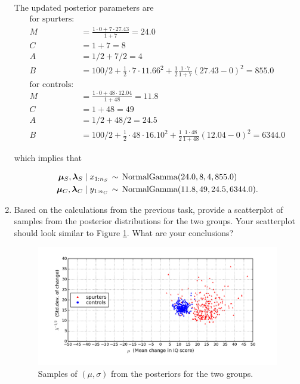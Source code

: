 \documentclass{article}
\begin{document}
\begin{enumerate}
The updated posterior parameters are
\begin{align*}
\text{for spurters:} & \\
    M & =\frac{1\cdot 0 + 7 \cdot 27.43}{1 + 7} = 24.0\\
    C & = 1 + 7 = 8\\
    A & = 1/2 + 7/2 = 4\\ 
    B &= 100/2 + \tfrac{1}{2}\cdot 7\cdot 11.66^2 + \tfrac{1}{2}\frac{1\cdot 7}{1 + 7}(27.43 - 0)^2 = 855.0 \\
\text{for controls:} & \\
    M & =\frac{1\cdot 0 + 48\cdot 12.04}{1 + 48} = 11.8\\
    C & = 1 + 48 = 49\\
    A & = 1/2 + 48/2 = 24.5\\
    B &= 100/2 + \tfrac{1}{2}\cdot 48\cdot 16.10^2 + \tfrac{1}{2}\frac{1\cdot 48}{1 + 48}(12.04 - 0)^2 = 6344.0
\end{align*}

which implies that 

\begin{align*}
\bm\mu_S,\bm\lambda_S\mid x_{1:n_S} &\,\sim\,\operatorname*{NormalGamma}(24.0,8,4,855.0)\\
\bm\mu_C,\bm\lambda_C\mid y_{1:n_C} &\,\sim\,\operatorname*{NormalGamma}(11.8,49,24.5,6344.0).
\end{align*}

\item Based on the calculations from the previous task, provide a scatterplot of samples from the posterior distributions for the two groups. Your scatterplot should look similar to Figure \ref{figure:pygmalion-posteriors}. What are your conclusions? 


\begin{figure}
  \begin{center}
    \includegraphics[width=1\textwidth]{examples/pygmalion-posteriors.png}
  \end{center}
  \caption{Samples of $(\mu,\sigma)$ from the posteriors for the two groups.}
  \label{figure:pygmalion-posteriors}
\end{figure}



\end{enumerate}
\end{document}
